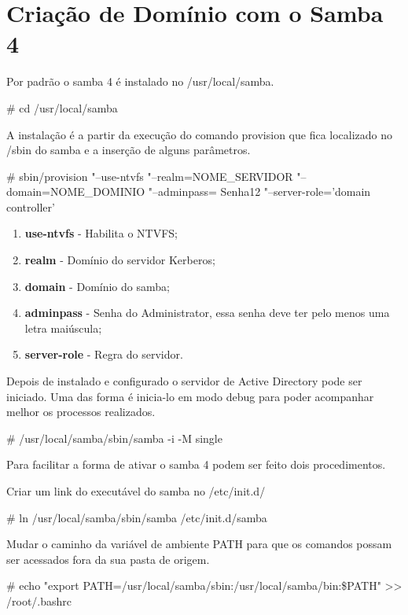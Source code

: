 \section{Criação de Domínio com o Samba 4}

Por padrão o samba 4 é instalado no /usr/local/samba.

\# cd /usr/local/samba

A instalação é a partir da execução do comando provision que fica localizado no /sbin do samba e a inserção de alguns parâmetros.

\# sbin/provision "--use-ntvfs "--realm=NOME\_SERVIDOR "--domain=NOME\_DOMINIO  "--adminpass= Senha12 "--server-role='domain controller'

\begin{enumerate}
	\item \textbf{use-ntvfs} - Habilita o NTVFS;
	\item \textbf{realm} - Domínio do servidor Kerberos;
	\item \textbf{domain} - Domínio do samba;
	\item \textbf{adminpass} - Senha do Administrator, essa senha deve ter pelo menos uma letra maiúscula;
	\item \textbf{server-role} - Regra do servidor.
\end{enumerate}

Depois de instalado e configurado o servidor de Active Directory pode ser iniciado. Uma das forma é inicia-lo em modo debug para poder acompanhar melhor os processos realizados.

\# /usr/local/samba/sbin/samba -i -M single

Para facilitar a forma de ativar o samba 4 podem ser feito dois procedimentos.

Criar um link do executável do samba no /etc/init.d/

\# ln /usr/local/samba/sbin/samba /etc/init.d/samba

Mudar o caminho da variável de ambiente PATH para que os comandos possam ser acessados fora da sua pasta de origem.

\# echo "export PATH=/usr/local/samba/sbin:/usr/local/samba/bin:\$PATH" >> /root/.bashrc


